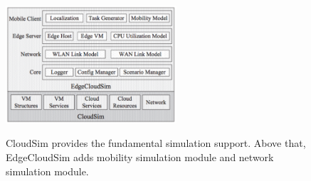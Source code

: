 {
\begin{figure}[th]
\begin{center}
	\centerline{\includegraphics[width=2.5in]{Figures/edgecloudsim.pdf}}
	{
		CloudSim provides the fundamental simulation support.
		Above that, EdgeCloudSim adds mobility simulation module
		and network simulation module.
	}
\end{center}
\end{figure}
}

